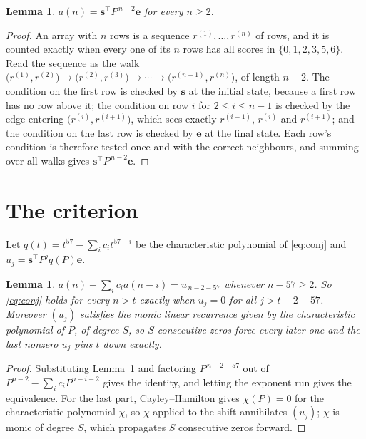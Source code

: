 \documentclass[11pt,a4paper]{article}
\theoremstyle{plain}
\newtheorem{lemma}[theorem]{Lemma}
\theoremstyle{definition}
\begin{document}
\begin{lemma}\label{lem:walk}
$a(n)=\mathbf{s}^{\!\top}P^{\,n-2}\mathbf{e}$ for every $n\ge2$.
\end{lemma}

\begin{proof}
An array with $n$ rows is a sequence $r^{(1)},\dots,r^{(n)}$ of rows, and it is counted
exactly when every one of its $n$ rows has all scores in $\{0,1,2,3,5,6\}$. Read the sequence as the
walk $\bigl(r^{(1)},r^{(2)}\bigr)\to\bigl(r^{(2)},r^{(3)}\bigr)\to\cdots\to
\bigl(r^{(n-1)},r^{(n)}\bigr)$, of length $n-2$. The condition on the first row is
checked by $\mathbf{s}$ at the initial state, because a first row has no row above it; the
condition on row $i$ for $2\le i\le n-1$ is checked by the edge entering
$\bigl(r^{(i)},r^{(i+1)}\bigr)$, which sees exactly $r^{(i-1)}$, $r^{(i)}$ and
$r^{(i+1)}$; and the condition on the last row is checked by $\mathbf{e}$ at the final
state. Each row's condition is therefore tested once and with the correct neighbours, and
summing over all walks gives $\mathbf{s}^{\!\top}P^{\,n-2}\mathbf{e}$.
\end{proof}

\section{The criterion}

Let $q(t)=t^{57}-\sum_i c_i t^{57-i}$ be the characteristic polynomial of
\eqref{eq:conj} and $u_j=\mathbf{s}^{\!\top}P^{j}q(P)\mathbf{e}$.

\begin{lemma}\label{lem:crit}
$a(n)-\sum_i c_i a(n-i)=u_{\,n-2-57}$ whenever $n-57\ge2$. So \eqref{eq:conj}
holds for every $n>t$ exactly when $u_j=0$ for all $j>t-2-57$. Moreover $(u_j)$
satisfies the monic linear recurrence given by the characteristic polynomial of $P$, of
degree $S$, so $S$ consecutive zeros force every later one and the last nonzero $u_j$ pins
$t$ down exactly.
\end{lemma}

\begin{proof}
Substituting Lemma~\ref{lem:walk} and factoring $P^{\,n-2-57}$ out of
$P^{n-2}-\sum_i c_i P^{n-i-2}$ gives the identity, and letting the exponent run gives the
equivalence. For the last part, Cayley--Hamilton gives $\chi(P)=0$ for the characteristic
polynomial $\chi$, so $\chi$ applied to the shift annihilates $(u_j)$; $\chi$ is monic of
degree $S$, which propagates $S$ consecutive zeros forward.
\end{proof}
\end{document}
